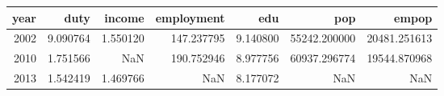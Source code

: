 \begin{tabular}{rrrrrrr}
\toprule
 year &      duty &    income &  employment &       edu &           pop &         empop \\
\midrule
 2002 &  9.090764 &  1.550120 &  147.237795 &  9.140800 &  55242.200000 &  20481.251613 \\
 2010 &  1.751566 &       NaN &  190.752946 &  8.977756 &  60937.296774 &  19544.870968 \\
 2013 &  1.542419 &  1.469766 &         NaN &  8.177072 &           NaN &           NaN \\
\bottomrule
\end{tabular}
